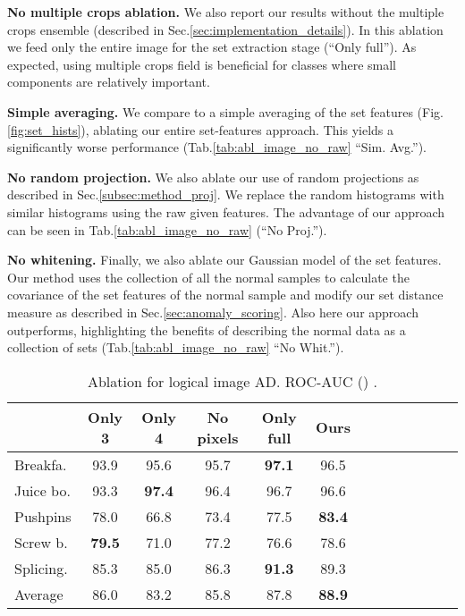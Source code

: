 \documentclass{article}
\begin{document}
\textbf{No multiple crops ablation.} We also report our results without the multiple crops ensemble (described in Sec.\ref{sec:implementation_details}). In this ablation we feed only the entire image for the set extraction stage (``Only full''). As expected, using multiple crops field is beneficial for classes where small components are relatively important.

\textbf{Simple averaging.}
We compare to a simple averaging of the set features (Fig. \ref{fig:set_hists}), ablating our entire set-features approach. This yields a significantly worse performance (Tab.\ref{tab:abl_image_no_raw} ``Sim. Avg.'').


\textbf{No random projection.} We also ablate our use of random projections as described in Sec.\ref{subsec:method_proj}. We replace the random histograms with similar histograms using the raw given features. The advantage of our approach can be seen in Tab.\ref{tab:abl_image_no_raw} (``No Proj.''). 



\textbf{No whitening.}
Finally, we also ablate our Gaussian model of the set features. Our method uses the collection of all the normal samples to calculate the covariance of the set features of the normal sample and modify our set distance measure as described in Sec.\ref{sec:anomaly_scoring}. Also here our approach outperforms, highlighting the benefits of describing the normal data as a collection of sets (Tab.\ref{tab:abl_image_no_raw} ``No Whit.'').

 
\begin{table}
\caption{Ablation for logical image AD. ROC-AUC  () .}
\centering
\small
\begin{tabular}{lcccccccccccc}
\toprule

	&	Only 3	&	Only 4	&	No pixels	&	Only full	& Ours 	\\
 \toprule

Breakfa.	&	93.9	&	95.6	&	95.7	&	\textbf{97.1}	&	96.5	\\
Juice bo.	&	93.3	&	\textbf{97.4}	&	96.4	&	96.7	&	96.6	\\
Pushpins	&	78.0	&	66.8	&	73.4	&	77.5	&	\textbf{83.4}	\\
Screw b.	&	\textbf{79.5}	&	71.0	&	77.2	&	76.6	&	78.6	\\
Splicing.	&	85.3	&	85.0	&	86.3	&	\textbf{91.3}	&	89.3	\\
\midrule											
Average	&	86.0	&	83.2	&	85.8	&	87.8	&	\textbf{88.9}	\\



 
\bottomrule
\end{tabular}
\label{tab:abl_image}
\end{table}
\end{document}
